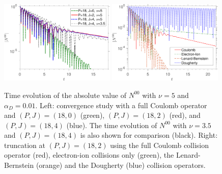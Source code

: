 %
\begin{figure}
    \centering
    \includegraphics[width=0.49\textwidth]{images/elDensity_convergence_alphaD001_nu5-eps-converted-to.pdf}
    \includegraphics[width=0.49\textwidth]{images/pj_18_2_eln00_t_nukparvth5_0_alphaD0_01-eps-converted-to.pdf}
    \caption{Time evolution of the absolute value of $N^{00}$ with $\nu=5$ and $\alpha_D=0.01$. Left: convergence study with a full Coulomb operator and $(P,J)=(18,0)$ (green), $(P,J)=(18,2)$ (red), and $(P,J)=(18,4)$ (blue). {The time evolution of $N^{00}$ with $\nu=3.5$ and $(P,J)=(18,4)$ is also shown for comparison (black)}. Right: truncation at $(P,J)=(18,2)$ using the full Coulomb collision operator (red), electron-ion collisions only (green), the Lenard-Bernstein (orange) and the Dougherty (blue) collision operators.}
    \label{fig:timetracecoul2}
\end{figure}

